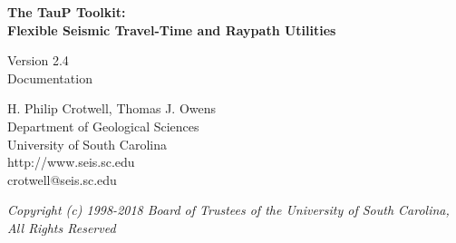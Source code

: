 
\begin{titlepage}
\begin{center}

\vspace{2in}

\LARGE
\textbf{
The TauP Toolkit: \\
Flexible Seismic Travel-Time and Raypath Utilities \\
}

\large
Version 2.4 \\
Documentation

\vspace{3in}

H. Philip Crotwell, Thomas J. Owens \\
Department of Geological Sciences \\
University of South Carolina \\
http://www.seis.sc.edu \\
crotwell@seis.sc.edu

\vspace{3in}

\textit{
\normalsize
Copyright (c) 1998-2018 Board of Trustees of the University of South Carolina, \\
All Rights Reserved
\normalsize}

\end{center}
\end{titlepage}
